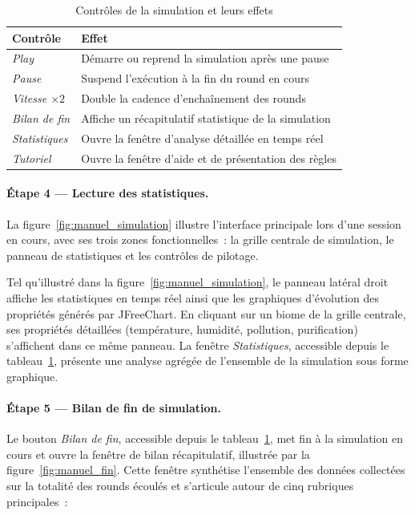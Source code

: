 \begin{table}[htbp]
  \centering
  \begin{tabular}{ll}
    \toprule
    \textbf{Contrôle} & \textbf{Effet} \\
    \midrule
    \textit{Play}              & Démarre ou reprend la simulation après une pause \\
    \textit{Pause}             & Suspend l'exécution à la fin du round en cours \\
    \textit{Vitesse $\times 2$} & Double la cadence d'enchaînement des rounds \\
    \textit{Bilan de fin}      & Affiche un récapitulatif statistique de la simulation \\
    \textit{Statistiques}      & Ouvre la fenêtre d'analyse détaillée en temps réel \\
    \textit{Tutoriel}          & Ouvre la fenêtre d'aide et de présentation des règles \\
    \bottomrule
  \end{tabular}
  \caption{Contrôles de la simulation et leurs effets}
  \label{tab:controles}
\end{table}

\paragraph{Étape 4 — Lecture des statistiques.}
La figure~\ref{fig:manuel_simulation} illustre l'interface principale lors d'une
session en cours, avec ses trois zones fonctionnelles~: la grille centrale de
simulation, le panneau de statistiques et les contrôles de pilotage.

Tel qu'illustré dans la figure~\ref{fig:manuel_simulation}, le panneau latéral
droit affiche les statistiques en temps réel ainsi que les graphiques d'évolution
des propriétés générés par JFreeChart. En cliquant sur un biome de la grille
centrale, ses propriétés détaillées (température, humidité, pollution,
purification) s'affichent dans ce même panneau. La fenêtre \textit{Statistiques},
accessible depuis le tableau~\ref{tab:controles}, présente une analyse agrégée
de l'ensemble de la simulation sous forme graphique.

\paragraph{Étape 5 — Bilan de fin de simulation.}
Le bouton \textit{Bilan de fin}, accessible depuis le tableau~\ref{tab:controles},
met fin à la simulation en cours et ouvre la fenêtre de bilan récapitulatif,
illustrée par la figure~\ref{fig:manuel_fin}.
Cette fenêtre synthétise l'ensemble des données collectées sur la totalité des
rounds écoulés et s'articule autour de cinq rubriques principales~:


